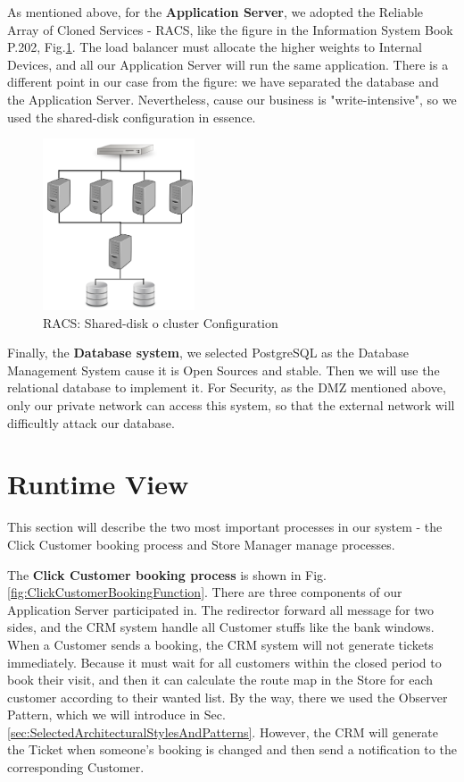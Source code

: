 \documentclass[a4paper,12pt]{report}
\begin{document}
As mentioned above, for the \textbf{Application Server}, we adopted the Reliable Array of Cloned Services - RACS, like the figure in the Information System Book P.202\cite{SistemiInformativi}, Fig.\ref{fig:RACS}.
The load balancer must allocate the higher weights to Internal Devices, and all our Application Server will run the same application.
There is a different point in our case from the figure: we have separated the database and the Application Server.
Nevertheless, cause our business is "write-intensive", so we used the shared-disk configuration in essence.

\begin{figure}[H]
	\centering
	\includegraphics[width=0.4\textwidth]{RACS}
	\caption{RACS: Shared-disk o cluster Configuration}
	\centering
	\label{fig:RACS}
\end{figure}


Finally, the \textbf{Database system}, we selected PostgreSQL as the Database Management System cause it is Open Sources and stable.
Then we will use the relational database to implement it.
For Security, as the DMZ mentioned above, only our private network can access this system, so that the external network will difficultly attack our database.


\section{Runtime View}\label{sec:RuntimeViwe}

This section will describe the two most important processes in our system - the Click Customer booking process and Store Manager manage processes.

The \textbf{Click Customer booking process} is shown in Fig.\ref{fig:ClickCustomerBookingFunction}.
There are three components of our Application Server participated in.
The redirector forward all message for two sides, and the CRM system handle all Customer stuffs like the bank windows.
When a Customer sends a booking, the CRM system will not generate tickets immediately.
Because it must wait for all customers within the closed period to book their visit, and then it can calculate the route map in the Store for each customer according to their wanted list.
By the way, there we used the Observer Pattern, which we will introduce in Sec.\ref{sec:SelectedArchitecturalStylesAndPatterns}.
However, the CRM will generate the Ticket when someone's booking is changed and then send a notification to the corresponding Customer.
\end{document}
